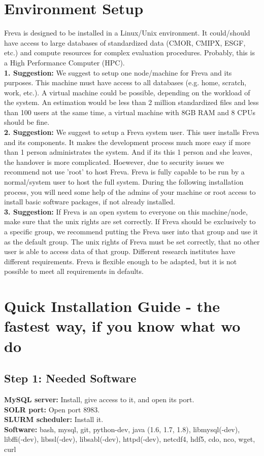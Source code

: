 \documentclass[a4paper,11pt]{ltxdoc}
\begin{document}
\section{Environment Setup} \label{set}
Freva is designed to be installed in a Linux/Unix environment. It could/should have access to large databases of standardized data (CMOR, CMIPX, ESGF, etc.) and compute resources for complex evaluation procedures. Probably, this is a High Performance Computer (HPC). \\
\textbf{1. Suggestion:} We suggest to setup one node/machine for Freva and its purposes. This machine must have access to all databases (e.g. home, scratch, work, etc.). A virtual machine could be possible, depending on the workload of the system. An estimation would be less than 2 million standardized files and less than 100 users at the same time, a virtual machine with 8GB RAM and 8 CPUs should be fine. \\
\textbf{2. Suggestion:} We suggest to setup a Freva system user. This user installs Freva and its components. It makes the development process much more easy if more than 1 person administrates the system. And if its this 1 person and she leaves, the handover is more complicated. Hoewever, due to security issues we recommend not use 'root' to host Freva. Freva is fully capable to be run by a normal/system user to host the full system. During the following installation process, you will need some help of the admins of your machine or root access to install basic software packages, if not already installed. \\
\textbf{3. Suggestion:} If Freva is an open system to everyone on this machine/node, make sure that the unix rights are set correctly. If Freva should be exclusively to a specific group, we recommend putting the Freva user into that group and use it as the default group. The unix rights of Freva must be set correctly, that no other user is able to access data of that group. Different research institutes have different requirements. Freva is flexible enough to be adapted, but it is not possible to meet all requirements in defaults.

\section{Quick Installation Guide - the fastest way, if you know what wo do} \label{quick}
\subsection{Step 1: Needed Software}
\textbf{MySQL server:} Install, give access to it, and open its port. \\
\textbf{SOLR port:} Open port 8983. \\
\textbf{SLURM scheduler:} Install it. \\
\textbf{Software:} bash, mysql, git, python-dev, java (1.6, 1.7, 1.8), libmysql(-dev), libffi(-dev), libssl(-dev), libsabl(-dev), httpd(-dev), netcdf4, hdf5, cdo, nco, wget, curl
\end{document}
